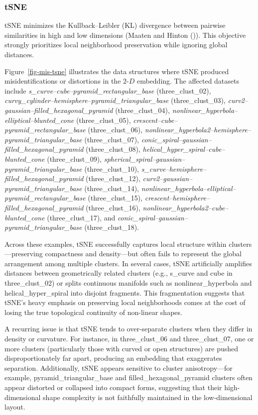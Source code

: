 \documentclass[
  11pt,
  a4paper,
]{report}
\newcommand\gD{$2\text{-}D$}
\begin{document}
\subsubsection{tSNE}\label{tsne}

tSNE minimizes the Kullback--Leibler (KL) divergence between pairwise
similarities in high and low dimensions (Maaten and Hinton
()). This objective strongly prioritizes
local neighborhood preservation while ignoring global distances.

Figure~\ref{fig-mis-tsne} illustrates the data structures where tSNE
produced misidentifications or distortions in the \gD{} embedding. The
affected datasets include
\emph{s\_curve--cube--pyramid\_rectangular\_base} (three\_clust\_02),
\emph{curvy\_cylinder--hemisphere--pyramid\_triangular\_base}
(three\_clust\_03), \emph{curv2--gaussian--filled\_hexagonal\_pyramid}
(three\_clust\_04),
\emph{nonlinear\_hyperbola--elliptical--blunted\_cone}
(three\_clust\_05), \emph{crescent--cube--pyramid\_rectangular\_base}
(three\_clust\_06),
\emph{nonlinear\_hyperbola2--hemisphere--pyramid\_triangular\_base}
(three\_clust\_07),
\emph{conic\_spiral--gaussian--filled\_hexagonal\_pyramid}
(three\_clust\_08), \emph{helical\_hyper\_spiral--cube--blunted\_cone}
(three\_clust\_09),
\emph{spherical\_spiral--gaussian--pyramid\_triangular\_base}
(three\_clust\_10),
\emph{s\_curve--hemisphere--filled\_hexagonal\_pyramid}
(three\_clust\_12), \emph{curv2--gaussian--pyramid\_triangular\_base}
(three\_clust\_14),
\emph{nonlinear\_hyperbola--elliptical--pyramid\_rectangular\_base}
(three\_clust\_15),
\emph{crescent--hemisphere--filled\_hexagonal\_pyramid}
(three\_clust\_16), \emph{nonlinear\_hyperbola2--cube--blunted\_cone}
(three\_clust\_17), and
\emph{conic\_spiral--gaussian--pyramid\_triangular\_base}
(three\_clust\_18).

Across these examples, tSNE successfully captures local structure within
clusters---preserving compactness and density---but often fails to
represent the global arrangement among multiple clusters. In several
cases, tSNE artificially amplifies distances between geometrically
related clusters (e.g., s\_curve and cube in three\_clust\_02) or splits
continuous manifolds such as nonlinear\_hyperbola and
helical\_hyper\_spiral into disjoint fragments. This fragmentation
suggests that tSNE's heavy emphasis on preserving local neighborhoods
comes at the cost of losing the true topological continuity of
non-linear shapes.

A recurring issue is that tSNE tends to over-separate clusters when they
differ in density or curvature. For instance, in three\_clust\_06 and
three\_clust\_07, one or more clusters (particularly those with curved
or open structures) are pushed disproportionately far apart, producing
an embedding that exaggerates separation. Additionally, tSNE appears
sensitive to cluster anisotropy---for example, pyramid\_triangular\_base
and filled\_hexagonal\_pyramid clusters often appear distorted or
collapsed into compact forms, suggesting that their high-dimensional
shape complexity is not faithfully maintained in the low-dimensional
layout.
\end{document}
